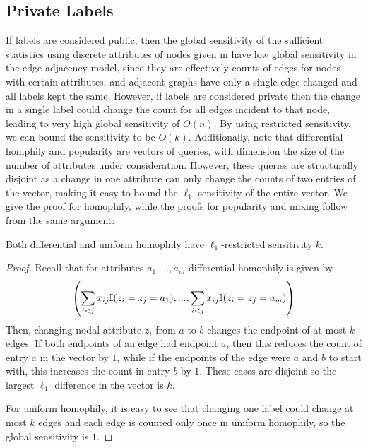 \subsection{Private Labels}

If labels are considered public, then the global sensitivity of the sufficient statistics using discrete attributes of nodes given in  have low global sensitivity in the edge-adjacency model, since they are effectively counts of edges for nodes with certain attributes, and adjacent graphs have only a single edge changed and all labels kept the same. However, if labels are considered private then the change in a single label could change the count for all edges incident to that node, leading to very high global sensitivity of $O(n)$. By using restricted sensitivity, we can bound the sensitivity to be $O(k)$. Additionally, note that differential homphily and popularity are vectors of queries, with dimension the size of the number of attributes under consideration. However, these queries are structurally disjoint as a change in one attribute can only change the counts of two entries of the vector, making it easy to bound the $\ell_1$-sensitivity of the entire vector. We give the proof for homophily, while the proofs for popularity and mixing follow from the same argument:

\begin{claim}
	Both differential and uniform homophily have $\ell_1$-restricted sensitivity $k$.
\end{claim}
\begin{proof}
Recall that for attributes $a_1,...,a_m$ differential homophily is given by  
$$\left(\sum\limits_{i < j} x_{ij} \mathbb{I} (z_i = z_j = a_1),..., \sum\limits_{i < j} x_{ij} \mathbb{I} (z_i = z_j = a_m)\right)$$
 Then, changing nodal attribute $z_i$ from $a$ to $b$ changes the endpoint of at most $k$ edges. If both endpoints of an edge had endpoint $a$, then this reduces the count of entry $a$ in the vector by $1$, while if the endpoints of the edge were $a$ and $b$ to start with, this increases the count in entry $b$ by $1$. These cases are disjoint so the largest $\ell_1$ difference in the vector is $k$. 

For uniform homophily, it is easy to see that changing one label could change at most $k$ edges and each edge is counted only once in uniform homophily, so the global sensitivity is $1$.
\end{proof}

